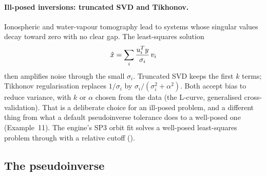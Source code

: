 \documentclass[main.tex]{subfiles}
\begin{document}
\paragraph{Ill-posed inversions: truncated SVD and Tikhonov.}
Ionospheric and water-vapour tomography lead to systems whose singular
values decay toward zero with no clear gap.  The least-squares solution
\begin{equation}
\hat{x} = \sum_i \frac{u_i^{T}y}{\sigma_i}\,v_i
\label{eq:la-svd-solution}
\end{equation}
then amplifies noise through the small $\sigma_i$.  Truncated SVD keeps the
first $k$ terms; Tikhonov regularisation replaces $1/\sigma_i$ by
$\sigma_i/(\sigma_i^2 + \alpha^2)$.  Both accept bias to reduce variance,
with $k$ or $\alpha$ chosen from the data (the L-curve, generalised
cross-validation).  That is a deliberate choice for an ill-posed problem,
and a different thing from what a default pseudoinverse tolerance does to a
well-posed one (Example~11).  The engine's SP3 orbit fit solves a
well-posed least-squares problem through  with a
relative cutoff ().

\subsection{The pseudoinverse}\label{sec:la-pinv}
\end{document}
